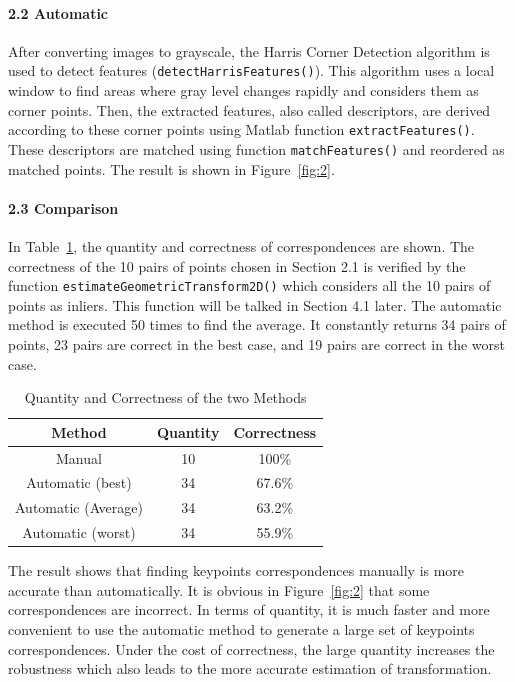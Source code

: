 \documentclass[10pt,twocolumn,letterpaper]{article}
\begin{document}
\paragraph{2.2 Automatic}
After converting images to grayscale, the Harris Corner Detection algorithm is used to detect features (\texttt{\textcolor[RGB]{28,172,0}{detectHarrisFeatures()}}). This algorithm uses a local window to find areas where gray level changes rapidly and considers them as corner points. Then, the extracted features, also called descriptors, are derived according to these corner points using Matlab function \texttt{\textcolor[RGB]{28,172,0}{extractFeatures()}}. These descriptors are matched using function \texttt{\textcolor[RGB]{28,172,0}{matchFeatures()}} and reordered as matched points. The result is shown in Figure~\ref{fig:2}.


\paragraph{2.3 Comparison}
In Table~\ref{tab:1}, the quantity and correctness of correspondences are shown. The correctness of the 10 pairs of points chosen in Section 2.1 is verified by the function \texttt{\textcolor[RGB]{28,172,0}{estimateGeometricTransform2D()}} which considers all the 10 pairs of points as inliers. This function will be talked in Section 4.1 later. The automatic method is executed 50 times to find the average. It constantly returns 34 pairs of points, 23 pairs are correct in the best case, and 19 pairs are correct in the worst case.

\begin{table}[h]
\small
    \centering
    \begin{tabular}{c|c|c}
        Method & Quantity & {Correctness} \\
        \hline
        Manual & 10 & 100\% \\ 
        \hline
        Automatic (best) & 34 & 67.6\% \\ 
        \hline
        Automatic (Average) & 34 & 63.2\% \\ 
        \hline
        Automatic (worst)  & 34 & 55.9\% \\ 
    \end{tabular}%
    \medbreak
    \caption{Quantity and Correctness of the two Methods}
    \label{tab:1}
\end{table}

\noindent The result shows that finding keypoints correspondences manually is more accurate than automatically. It is obvious in Figure~\ref{fig:2} that some correspondences are incorrect. In terms of quantity, it is much faster and more convenient to use the automatic method to generate a large set of keypoints correspondences. Under the cost of correctness, the large quantity increases the robustness which also leads to the more accurate estimation of transformation.
\end{document}
